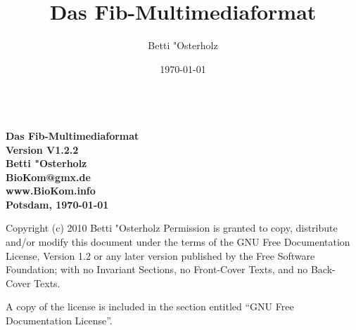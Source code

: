 \documentclass[11pt,a4paper]{article}
\begin{document}
\setlength{\unitlength}{1cm} %

\title{Das Fib-Multimediaformat}
\author{Betti "Osterholz}
\date{\today}

\begin{titlepage}
	\begin{center}
	\ \vspace{2.5cm} \\
	\Huge\bf Das Fib-Multimediaformat\\\vspace{0.5cm}
	\LARGE Version V1.2.2\\\vspace{2cm}
	\LARGE Betti "Osterholz\\\vspace{0.5cm}
	\large BioKom@gmx.de\\\vspace{0.5cm}
	\large www.BioKom.info\\\vspace{0.5cm}
	Potsdam, \today\\\vspace{5.5cm}
	\end{center}
	
	\noindent
Copyright (c) 2010  Betti "Osterholz
\newline\newline
Permission is granted to copy, distribute and/or modify this document under the terms of the GNU Free Documentation License, Version 1.2 or any later version published by the Free Software Foundation; with no Invariant Sections, no Front-Cover Texts, and no Back-Cover Texts.

A copy of the license is included in the section entitled "`GNU Free Documentation License"'.
\end{titlepage}

\renewcommand{\sectionmark}[1]{\markboth{#1}{}}
\pagestyle{scrheadings} %
\setheadsepline{0.4pt}
\ihead{} %
\ohead{} %
\chead{\slshape \headmark}  %
\cfoot{\thepage} %


\ihead{\slshape \headmark } %
\ohead{}
\chead{}
\clearpage
\end{document}
